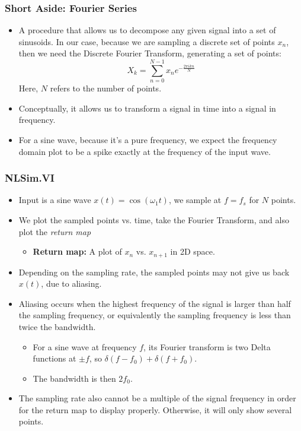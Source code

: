 \documentclass[9pt]{beamer}
\begin{document}
\begin{frame}
	\frametitle{Short Aside: Fourier Series}
	\begin{itemize}
		\item A procedure that allows us to decompose any given signal into a set of
			sinusoids. In our case, because we are sampling a discrete set of points
			\( x_n \), then we need the Discrete Fourier Transform, generating a set
			of points:
			\[
				X_k = \sum_{n = 0}^{N - 1}x_n e^{- \frac{2\pi i kn}{N}}
			\]
			Here, \( N \) refers to the number of points. 
		\item Conceptually, it allows us to transform a signal in time into a signal
			in frequency. 
		\item For a sine wave, because it's a pure frequency, we expect the frequency
			domain plot to be a spike exactly at the frequency of the input wave.
	\end{itemize}
\end{frame}
\begin{frame}
	\frametitle{NLSim.VI}
	\begin{itemize}
		\item Input is a sine wave \( x(t) = \cos(\omega_1 t) \), we sample at \( f =
			f_s\) for \( N \) points. 
		\item We plot the sampled points vs. time, take the Fourier Transform, and
			also plot the \textit{return map}
			\begin{itemize}
				\item \textbf{Return map:} A plot of \( x_n \) vs. \( x_{n + 1} \) in
					2D space. 
			\end{itemize}
		\item Depending on the sampling rate, the sampled points may not give us back
			\( x(t) \), due to aliasing.
		\item Aliasing occurs when the highest frequency of the signal is larger than
			half the sampling frequency, or equivalently the sampling frequency is
			less than twice the bandwidth. 
			\begin{itemize}
				\item For a sine wave at frequency \( f \), its Fourier transform is
					two Delta functions at \( \pm f \), so \( \delta(f - f_0) +
					\delta(f + f_0) \). 
				\item The bandwidth is then \( 2f_0 \). 
			\end{itemize}
		\item The sampling rate also cannot be a multiple of the signal frequency in
			order for the return map to display properly. Otherwise, it will only
			show several points. 
	\end{itemize}
\end{frame}
\end{document}
